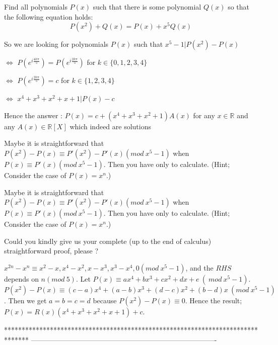 \begin{solution}
	\begin{tcolorbox}Find all polynomials $P(x)$ such that there is some polynomial $Q(x)$ so that the following equation holds: \[P\left(x^{2} \right)+ Q\left(x \right)=P\left(x \right)+x^{5}Q\left(x \right)\]\end{tcolorbox}
So we are looking for polynomials $P(x)$ such that $x^5-1|P(x^2)-P(x)$

$\iff$ $P(e^{i\frac{4k\pi}5})=P(e^{i\frac{2k\pi}5})$ for $k\in\{0,1,2,3,4\}$

$\iff$ $P(e^{i\frac{2k\pi}5})=c$ for $k\in\{1,2,3,4\}$

$\iff$ $x^4+x^3+x^2+x+1|P(x)-c$

Hence the answer : $\boxed{P(x)=c+(x^4+x^3+x^2+1)A(x)}$ for any $x\in\mathbb R$ and any $A(x)\in\mathbb R[X]$ which indeed are solutions
\end{solution}



\begin{solution}
	Maybe it is straightforward that $P(x^2)-P(x)\equiv P'(x^2)-P'(x)(mod\ x^5-1)$ when $P(x)\equiv P'(x)(mod\ x^5-1)$. Then you have only to calculate. (Hint; Consider the case of $P(x)=x^n$.)
\end{solution}



\begin{solution}
	\begin{tcolorbox}Maybe it is straightforward that $P(x^2)-P(x)\equiv P'(x^2)-P'(x)(mod\ x^5-1)$ when $P(x)\equiv P'(x)(mod\ x^5-1)$. Then you have only to calculate. (Hint; Consider the case of $P(x)=x^n$.)\end{tcolorbox}
Could you kindly give us your complete (up to the end of calculus) straightforward proof, please ?
\end{solution}



\begin{solution}
	$x^{2n}-x^n\equiv x^2-x,x^4-x^2,x-x^3,x^3-x^4,0 (mod\ x^5-1)$, and the $RHS$ depends on $n (mod\ 5)$.
Let $P(x)\equiv ax^4+bx^3+cx^2+dx+e\ (\ mod\ x^5-1)$. 
$P(x^2)-P(x)\equiv (c-a)x^4+(a-b)x^3+(d-c)x^2+(b-d)x\ (mod\ x^5-1)$. Then we get $a=b=c=d$ because $P(x^2)-P(x)\equiv 0$.
Hence the result; $P(x)=R(x)(x^4+x^3+x^2+x+1)+c$.
\end{solution}
*******************************************************************************
-------------------------------------------------------------------------------

